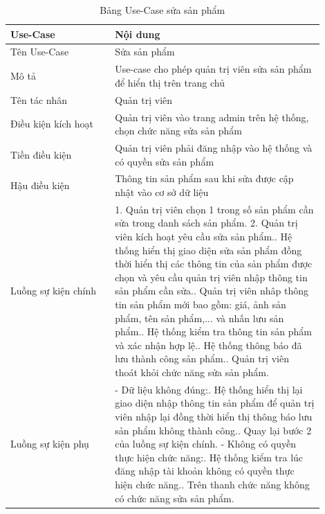 \begin{longtable}[htp]{ |m{0.3\linewidth}|m{0.6\linewidth}|}
 \caption{Bảng Use-Case sửa sản phẩm \label{updateProduct}}\\
 \hline
 Use-Case & Nội dung \\
 \hline
 Tên Use-Case & Sửa sản phẩm \\
 \hline
 Mô tả & Use-case cho phép quản trị viên sửa sản phẩm để hiển thị trên trang chủ\\
 \hline
 Tên tác nhân & Quản trị viên\\
 \hline
 Điều kiện kích hoạt & Quản trị viên vào trang admin trên hệ thống, chọn chức năng sửa sản phẩm\\
 \hline
 Tiền điều kiện & Quản trị viên phải đăng nhập vào hệ thống và có quyền sửa sản phẩm\\
 \hline
 Hậu điều kiện & Thông tin sản phẩm sau khi sửa được cập nhật vào cơ sở dữ liệu\\
 \hline
 Luồng sự kiện chính & 
 1. Quản trị viên chọn 1 trong số sản phẩm cần sửa trong danh sách sản phẩm.
 2. Quản trị viên kích hoạt yêu cầu sửa sản phẩm.\newline
 3. Hệ thống hiển thị giao diện sửa sản phẩm đồng thời hiển thị các thông tin của sản phẩm được chọn và yêu cầu quản trị viên nhập thông tin sản phẩm cần sửa.\newline
 4. Quản trị viên nhâp thông tin sản phẩm mới bao gồm: giá, ảnh sản phẩm, tên sản phẩm,... và nhấn lưu sản phẩm.\newline
 5. Hệ thống kiểm tra thông tin sản phẩm và xác nhận hợp lệ.\newline
 6. Hệ thống thông báo đã lưu thành công sản phẩm.\newline	
 7. Quản trị viên thoát khỏi chức năng sửa sản phẩm.
 \\
 \hline
 Luồng sự kiện phụ & 
 - Dữ liệu không đúng:\newline
  1. Hệ thống hiển thị lại giao diện nhập thông tin sản phẩm để quản trị viên nhập lại đồng thời hiển thị thông báo lưu sản phẩm không thành công.\newline
  2. Quay lại bước 2 của luồng sự kiện chính.\newline
  - Không có quyền thực hiện chức năng:\newline
  1. Hệ thống kiểm tra lúc đăng nhập tài khoản không có quyền thực hiện chức năng.\newline
  2. Trên thanh chức năng không có chức năng sửa sản phẩm.
 \\
 \hline
\end{longtable}
